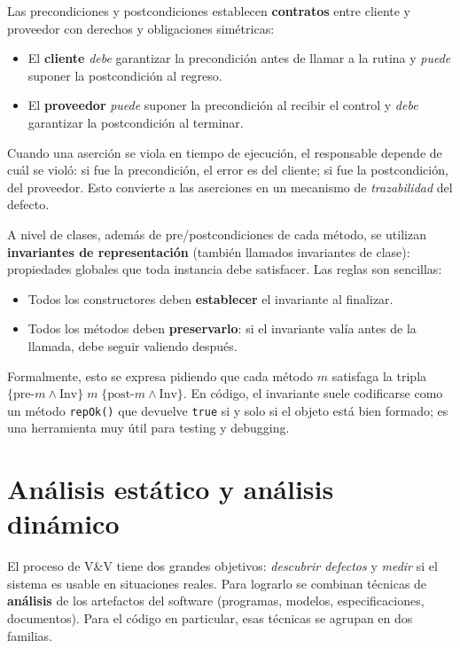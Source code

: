 \documentclass[12pt,a4paper]{article}
\begin{document}
Las precondiciones y postcondiciones establecen \textbf{contratos} entre cliente y proveedor con derechos y obligaciones simétricas:
\begin{itemize}
  \item El \textbf{cliente} \textit{debe} garantizar la precondición antes de llamar a la rutina y \textit{puede} suponer la postcondición al regreso.
  \item El \textbf{proveedor} \textit{puede} suponer la precondición al recibir el control y \textit{debe} garantizar la postcondición al terminar.
\end{itemize}

Cuando una aserción se viola en tiempo de ejecución, el responsable depende de cuál se violó: si fue la precondición, el error es del cliente; si fue la postcondición, del proveedor. Esto convierte a las aserciones en un mecanismo de \textit{trazabilidad} del defecto.

A nivel de clases, además de pre/postcondiciones de cada método, se utilizan \textbf{invariantes de representación} (también llamados invariantes de clase): propiedades globales que toda instancia debe satisfacer. Las reglas son sencillas:
\begin{itemize}
  \item Todos los constructores deben \textbf{establecer} el invariante al finalizar.
  \item Todos los métodos deben \textbf{preservarlo}: si el invariante valía antes de la llamada, debe seguir valiendo después.
\end{itemize}

Formalmente, esto se expresa pidiendo que cada método $m$ satisfaga la tripla $\{\text{pre-}m \wedge \text{Inv}\}\; m\; \{\text{post-}m \wedge \text{Inv}\}$. En código, el invariante suele codificarse como un método \texttt{repOk()} que devuelve \texttt{true} si y solo si el objeto está bien formado; es una herramienta muy útil para testing y debugging.

\section{Análisis estático y análisis dinámico}
El proceso de V\&V tiene dos grandes objetivos: \textit{descubrir defectos} y \textit{medir} si el sistema es usable en situaciones reales. Para lograrlo se combinan técnicas de \textbf{análisis} de los artefactos del software (programas, modelos, especificaciones, documentos). Para el código en particular, esas técnicas se agrupan en dos familias.
\end{document}
